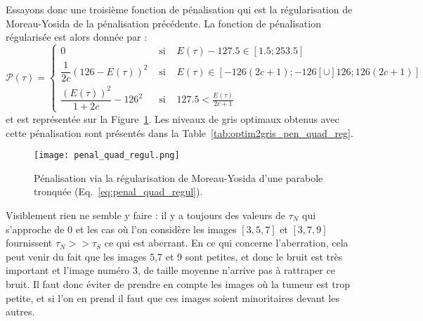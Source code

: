 \documentclass[main.tex]{subfiles}
\begin{document}
Essayons donc une troisième fonction de pénalisation qui est la régularisation de Moreau-Yosida de la pénalisation précédente.
La fonction de pénalisation régularisée est alors donnée par :
\begin{equation}
\label{eq:penal_quad_regul}
\mathcal{P}(\tau)=\left\{  \begin{aligned}
0 & \textrm{ si } & E(\tau) - 127.5 \in [ 1.5;253.5 ] \\
\dfrac{1}{2c} ( 126 - E(\tau) )^2 & \textrm{ si } & E(\tau)  \in [-126(2c+1) ; -126 [ \cup ] 126; 126(2c+1) ] \\
\dfrac{(E(\tau))^2}{1+2c}-126^2 & \textrm{ si } & 127.5 < \frac{ E(\tau) }{ 2c+1 }
\end{aligned}  \right.
\end{equation}
et est représentée sur la Figure~\ref{fig:penal_quad_regul}. Les niveaux de gris optimaux obtenus avec cette pénalisation sont présentés dans la Table~\ref{tab:optim2gris_pen_quad_reg}.
\begin{figure}
\centering
\texttt{[image: penal\_quad\_regul.png]}
\vspace{-3mm}
\caption{\label{fig:penal_quad_regul} Pénalisation via la régularisation de Moreau-Yosida d'une parabole tronquée (\cf Eq.~\eqref{eq:penal_quad_regul}). }
\end{figure}

Visiblement rien ne semble y faire : il y a toujours des valeurs de $\tau_N$ qui s'approche de 0 et les cas où l'on considère les images $[3,5,7]$ et $[3,7,9]$ fournissent $\tau_N >> \tau_S$ ce qui est aberrant. 
En ce qui concerne l'aberration, cela peut venir du fait que les images 5,7 et 9 sont petites, et donc le bruit est très important et l'image numéro 3, de taille moyenne n'arrive pas à rattraper ce bruit. Il faut donc éviter de prendre en compte les images où la tumeur est trop petite, et si l'on en prend il faut que ces images soient minoritaires devant les autres.
\end{document}
